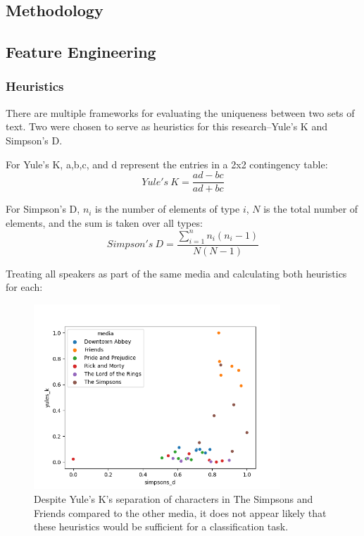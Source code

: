 \documentclass{article}
\newcommand{\largeimagewidth}{350}
\begin{document}
\begin{titlepage}
\section{Methodology}
\subsection{Feature Engineering}
\subsubsection{Heuristics}
There are multiple frameworks for evaluating the uniqueness between two sets of text. Two were chosen to serve as heuristics for this research–Yule's K and Simpson's D.

For Yule's K, a,b,c, and d represent the entries in a 2x2 contingency table:
\[
Yule's\ K = \frac{ad - bc}{ad + bc}
\]

For Simpson's D, $n_i$ is the number of elements of type $i$, $N$ is the total number of elements, and the sum is taken over all types:
\[
Simpson's\ D = \frac{\sum_{i=1}^{n} n_i(n_i - 1)}{N(N - 1)}
\]

Treating all speakers as part of the same media and calculating both heuristics for each:

\begin{figure}[H]
\centering
\includegraphics[width=\largeimagewidth]{images/heuristics.png}
\caption{Despite Yule's K's separation of characters in The Simpsons and Friends compared to the other media, it does not appear likely that these heuristics would be sufficient for a classification task.}
\end{figure}


\end{titlepage}
\end{document}
